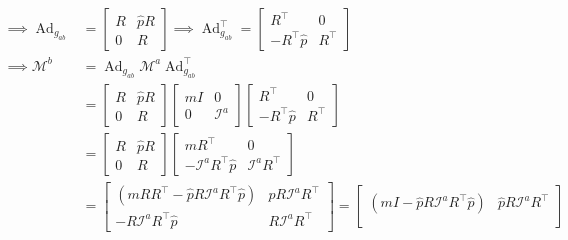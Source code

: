 \begin{align*}
    \implies
    \operatorname{Ad}_{g_{a b}}
     & =
    \begin{bmatrix}
        R & \widehat{p} R \\
        0 & R
    \end{bmatrix}
    \implies
    \operatorname{Ad}_{g_{a b}}^{\top}
    =
    \begin{bmatrix}
        R^{\top}              & 0        \\
        - R^{\top}\widehat{p} & R^{\top}
    \end{bmatrix}
    \\
    \implies
    \mathcal{M}^{b}
     & =
    \operatorname{Ad}_{g_{a b}} \mathcal{M}^{a} \operatorname{Ad}_{g_{a b}}^{\top}
    \\ & =
    \begin{bmatrix}
        R & \widehat{p} R \\
        0 & R
    \end{bmatrix}
    \begin{bmatrix}
        mI & 0               \\
        0  & \mathcal{I}^{a}
    \end{bmatrix}
    \begin{bmatrix}
        R^{\top}              & 0        \\
        - R^{\top}\widehat{p} & R^{\top}
    \end{bmatrix}
    \\ & =
    \begin{bmatrix}
        R & \widehat{p} R \\
        0 & R
    \end{bmatrix}
    \begin{bmatrix}
        mR^{\top}                             & 0                        \\
        - \mathcal{I}^{a} R^{\top}\widehat{p} & \mathcal{I}^{a} R^{\top}
    \end{bmatrix}
    \\ & =
    \begin{bmatrix}
        (mRR^{\top} - \widehat{p} R \mathcal{I}^{a} R^{\top}\widehat{p}) & \widehat{p} R \mathcal{I}^{a} R^{\top} \\
        - R\mathcal{I}^{a} R^{\top}\widehat{p}                           & R\mathcal{I}^{a} R^{\top}
    \end{bmatrix}
    =
    \begin{bmatrix}
        (mI - \widehat{p} R \mathcal{I}^{a} R^{\top}\widehat{p}) & \widehat{p} R \mathcal{I}^{a} R^{\top} \\

\end{bmatrix}
\end{align*}
